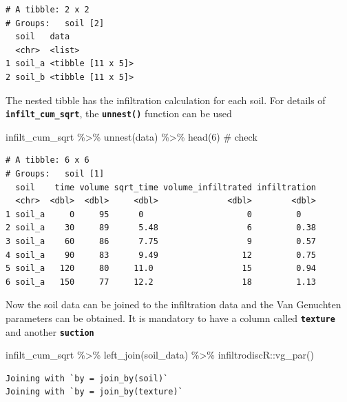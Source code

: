 \documentclass[
]{article}
\newenvironment{Shaded}{\begin{snugshade}}{\end{snugshade}}
\newcommand{\CommentTok}[1]{\textcolor[rgb]{0.37,0.37,0.37}{#1}}
\newcommand{\DecValTok}[1]{\textcolor[rgb]{0.68,0.00,0.00}{#1}}
\newcommand{\FunctionTok}[1]{\textcolor[rgb]{0.28,0.35,0.67}{#1}}
\newcommand{\NormalTok}[1]{\textcolor[rgb]{0.00,0.23,0.31}{#1}}
\newcommand{\SpecialCharTok}[1]{\textcolor[rgb]{0.37,0.37,0.37}{#1}}
\begin{document}
\begin{verbatim}
# A tibble: 2 x 2
# Groups:   soil [2]
  soil   data             
  <chr>  <list>           
1 soil_a <tibble [11 x 5]>
2 soil_b <tibble [11 x 5]>
\end{verbatim}

The nested tibble has the infiltration calculation for each soil. For
details of \textbf{\texttt{infilt\_cum\_sqrt}}, the
\textbf{\texttt{unnest()}} function can be used

\begin{Shaded}
\begin{Highlighting}[]
\NormalTok{infilt\_cum\_sqrt }\SpecialCharTok{\%\textgreater{}\%} 
  \FunctionTok{unnest}\NormalTok{(data) }\SpecialCharTok{\%\textgreater{}\%} 
  \FunctionTok{head}\NormalTok{(}\DecValTok{6}\NormalTok{) }\CommentTok{\# check }
\end{Highlighting}
\end{Shaded}

\begin{verbatim}
# A tibble: 6 x 6
# Groups:   soil [1]
  soil    time volume sqrt_time volume_infiltrated infiltration
  <chr>  <dbl>  <dbl>     <dbl>              <dbl>        <dbl>
1 soil_a     0     95      0                     0         0   
2 soil_a    30     89      5.48                  6         0.38
3 soil_a    60     86      7.75                  9         0.57
4 soil_a    90     83      9.49                 12         0.75
5 soil_a   120     80     11.0                  15         0.94
6 soil_a   150     77     12.2                  18         1.13
\end{verbatim}

\newpage{}

Now the soil data can be joined to the infiltration data and the Van
Genuchten parameters can be obtained. It is mandatory to have a column
called \textbf{\texttt{texture}} and another \textbf{\texttt{suction}}

\begin{Shaded}
\begin{Highlighting}[]
\NormalTok{infilt\_cum\_sqrt }\SpecialCharTok{\%\textgreater{}\%} 
  \FunctionTok{left\_join}\NormalTok{(soil\_data) }\SpecialCharTok{\%\textgreater{}\%} 
\NormalTok{  infiltrodiscR}\SpecialCharTok{::}\FunctionTok{vg\_par}\NormalTok{()}
\end{Highlighting}
\end{Shaded}

\begin{verbatim}
Joining with `by = join_by(soil)`
Joining with `by = join_by(texture)`
\end{verbatim}
\end{document}
